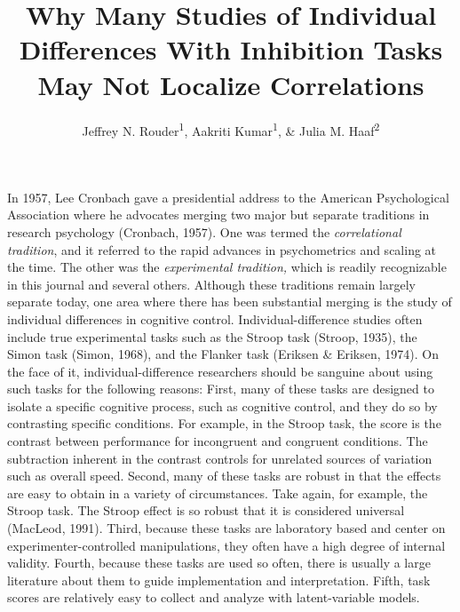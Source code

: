 \documentclass[
  ,man]{apa6}
\title{Why Many Studies of Individual Differences With Inhibition Tasks May Not Localize Correlations}
\author{Jeffrey N. Rouder\textsuperscript{1}, Aakriti Kumar\textsuperscript{1}, \& Julia M. Haaf\textsuperscript{2}}
\date{}
\affiliation{\vspace{0.5cm}\textsuperscript{1} University of California, Irvine\\\textsuperscript{2} University of Amsterdam}
\begin{document}
\maketitle

In 1957, Lee Cronbach gave a presidential address to the American Psychological Association where he advocates merging two major but separate traditions in research psychology (Cronbach, 1957). One was termed the \emph{correlational tradition}, and it referred to the rapid advances in psychometrics and scaling at the time. The other was the \emph{experimental tradition,} which is readily recognizable in this journal and several others. Although these traditions remain largely separate today, one area where there has been substantial merging is the study of individual differences in cognitive control. Individual-difference studies often include true experimental tasks such as the Stroop task (Stroop, 1935), the Simon task (Simon, 1968), and the Flanker task (Eriksen \& Eriksen, 1974). On the face of it, individual-difference researchers should be sanguine about using such tasks for the following reasons: First, many of these tasks are designed to isolate a specific cognitive process, such as cognitive control, and they do so by contrasting specific conditions. For example, in the Stroop task, the score is the contrast between performance for incongruent and congruent conditions. The subtraction inherent in the contrast controls for unrelated sources of variation such as overall speed. Second, many of these tasks are robust in that the effects are easy to obtain in a variety of circumstances. Take again, for example, the Stroop task. The Stroop effect is so robust that it is considered universal (MacLeod, 1991). Third, because these tasks are laboratory based and center on experimenter-controlled manipulations, they often have a high degree of internal validity. Fourth, because these tasks are used so often, there is usually a large literature about them to guide implementation and interpretation. Fifth, task scores are relatively easy to collect and analyze with latent-variable models.
\end{document}
